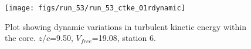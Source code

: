 \begin{figure}[H]
\centering
\texttt{[image: figs/run\_53/run\_53\_ctke\_01rdynamic]}
\caption{Plot showing dynamic variations in turbulent kinetic energy within the core. $z/c$=9.50, $V_{free}$=19.08, station 6.}
\label{fig:run_53_ctke_01rdynamic}
\end{figure}


